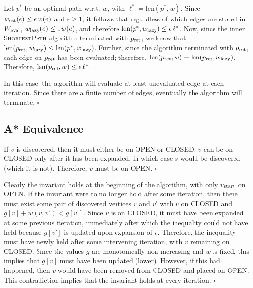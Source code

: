\documentclass[nobib]{tufte-book}
\newcommand{\ms}[1]{\mbox{\scriptsize #1}}
\newenvironment{proof}[1][Proof]{\begin{trivlist}
   \item[\hskip \labelsep {\bfseries #1}]}{\hfill$\square$\end{trivlist}}
\begin{document}
\begin{proof}[Proof of Theorem \ref{thm:lazy-optimality}]
Let $p^*$ be an optimal path w.r.t. $w$,
with $\ell^* = \mbox{len}(p^*, w)$.
Since $w_{\ms{est}}(e) \leq \epsilon \, w(e)$ and $\epsilon \geq 1$,
it follows that regardless of which edges are stored in $W_{\ms{eval}}$,
$w_{\ms{lazy}}(e) \leq \epsilon \, w(e)$,
and therefore
$\mbox{len}(p^*, w_{\ms{lazy}}) \leq \epsilon \, \ell^*$.
Now,
since the inner \textsc{ShortestPath} algorithm terminated with
$p_{\ms{ret}}$,
we know that
$\mbox{len}(p_{\ms{ret}}, w_{\ms{lazy}}) \leq \mbox{len}(p^*, w_{\ms{lazy}})$.
Further,
since the algorithm terminated with $p_{\ms{ret}}$,
each edge on $p_{\ms{ret}}$ has been evaluated;
therefore,
$\mbox{len}(p_{\ms{ret}}, w) = \mbox{len}(p_{\ms{ret}}, w_{\ms{lazy}})$.
Therefore,
$\mbox{len}(p_{\ms{ret}}, w) \leq \epsilon \, \ell^*$.
\end{proof}

\begin{proof}[Proof of Theorem \ref{thm:lazy-completeness}]
In this case,
the algorithm will evaluate at least unevaluated edge at
each iteration.
Since there are a finite number of edges,
eventually the algorithm will terminate.
\end{proof}

\subsection{A* Equivalence}

\begin{proof}[Proof of Invariant \ref{inv:astar-cundisc-popen}]
If $v$ is discovered, then it must either be on OPEN or CLOSED.
$v$ can be on CLOSED only after it has been expanded,
in which case $s$ would be discovered (which it is not).
Therefore, $v$ must be on OPEN.
\end{proof}

\begin{proof}[Proof of Invariant \ref{inv:astar-wless-popen}]
Clearly the invariant holds at the beginning of the algorithm,
with only $v_{\ms{start}}$ on OPEN.
If the invariant were to no longer hold after some iteration,
then there must exist some pair of discovered vertices $v$ and $v'$
with $v$ on CLOSED and $g[v] + w(v,v') < g[v']$.
Since $v$ is on CLOSED,
it must have been expanded at some previous iteration,
immediately after which the inequality could not have held
because $g[v']$ is updated upon expansion of $v$.
Therefore,
the inequality must have newly held after some intervening iteration,
with $v$ remaining on CLOSED.
Since the values $g$ are monotonically non-increasing and $w$ is fixed,
this implies that $g[v]$ must have been updated (lower).
However,
if this had happened,
then $v$ would have been removed from CLOSED and placed on OPEN.
This contradiction implies that the invariant holds at every iteration.
\end{proof}
\end{document}
